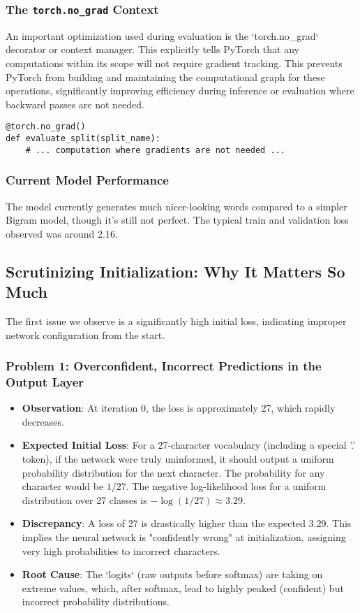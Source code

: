 \subsubsection{The \texttt{torch.no_grad} Context}
An important optimization used during evaluation is the `torch.no_grad` decorator or context manager. This explicitly tells PyTorch that any computations within its scope will not require gradient tracking. This prevents PyTorch from building and maintaining the computational graph for these operations, significantly improving efficiency during inference or evaluation where backward passes are not needed.

\begin{lstlisting}
@torch.no_grad()
def evaluate_split(split_name):
    # ... computation where gradients are not needed ...
\end{lstlisting}

\subsubsection{Current Model Performance}
The model currently generates much nicer-looking words compared to a simpler Bigram model, though it's still not perfect. The typical train and validation loss observed was around 2.16.

\subsection{Scrutinizing Initialization: Why It Matters So Much}

The first issue we observe is a significantly high initial loss, indicating improper network configuration from the start.

\subsubsection{Problem 1: Overconfident, Incorrect Predictions in the Output Layer}
\begin{itemize}
    \item \textbf{Observation}: At iteration 0, the loss is approximately 27, which rapidly decreases.
    \item \textbf{Expected Initial Loss}: For a 27-character vocabulary (including a special '.' token), if the network were truly uninformed, it should output a uniform probability distribution for the next character. The probability for any character would be $1/27$. The negative log-likelihood loss for a uniform distribution over 27 classes is $-\log(1/27) \approx 3.29$.
    \item \textbf{Discrepancy}: A loss of 27 is drastically higher than the expected 3.29. This implies the neural network is "confidently wrong" at initialization, assigning very high probabilities to incorrect characters.
    \item \textbf{Root Cause}: The `logits` (raw outputs before softmax) are taking on extreme values, which, after softmax, lead to highly peaked (confident) but incorrect probability distributions.
\end{itemize}

